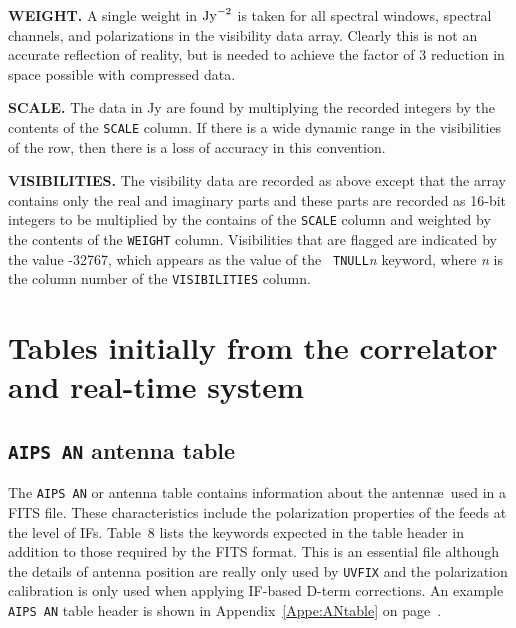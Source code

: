 \documentclass[twoside]{article}
\begin{document}
{\bf WEIGHT\@.} A single weight in ${\rm Jy}^{-2}$ is taken for all
spectral windows, spectral channels, and polarizations in the
visibility data array.  Clearly this is not an accurate reflection of
reality, but is needed to achieve the factor of 3 reduction in space
possible with compressed data.

{\bf SCALE\@.} The data in Jy are found by multiplying the recorded
integers by the contents of the {\tt SCALE} column.  If there is a
wide dynamic range in the visibilities of the row, then there is a
loss of accuracy in this convention.

{\bf VISIBILITIES\@.} The visibility data are recorded as above
except that the array contains only the real and imaginary parts and
these parts are recorded as 16-bit integers to be multiplied by the
contains of the {\tt SCALE} column and weighted by the contents of the
{\tt WEIGHT} column.  Visibilities that are flagged are indicated by
the value -32767, which appears as the value of the {\tt
  TNULL}{\it n} keyword, where {\it n} is the column number of the
{\tt VISIBILITIES} column.

\vfill\eject
\section{Tables initially from the correlator and real-time system}
\label{s:online}

\subsection{{\tt AIPS AN} antenna table}
\label{s:AN}

The {\tt AIPS AN} or antenna table contains information about the
antenn\ae\ used in a FITS file.  These characteristics include the
polarization properties of the feeds at the level of IFs.  Table~8
lists the keywords expected in the table header in addition to those
required by the FITS format.  This is an essential file although the
details of antenna position are really only used by {\tt UVFIX} and
the polarization calibration is only used when applying IF-based
D-term corrections.  An example {\tt AIPS AN} table header is
shown in Appendix~\ref{Appe:ANtable} on page~\pageref{Appe:ANtable}.
\end{document}
